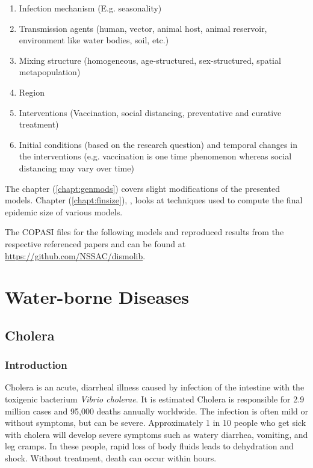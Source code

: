 \documentclass{book}\usepackage[]{graphicx}\usepackage[]{color}
\begin{document}
\begin{enumerate}
    \item Infection mechanism (E.g. seasonality)
    \item Transmission agents (human, vector, animal host, animal reservoir, environment like water bodies, soil, etc.)
    \item Mixing structure (homogeneous, age-structured, sex-structured, spatial metapopulation)
    \item Region
    \item Interventions (Vaccination, social distancing, preventative and curative treatment)
    \item Initial conditions (based on the research question) and temporal changes in the interventions (e.g. vaccination is one time phenomenon whereas social distancing may vary over time)
\end{enumerate}

The  chapter (\ref{chapt:genmods}) covers slight modifications of the presented models. Chapter (\ref{chapt:finsize}), , looks at techniques used to compute the final epidemic size of various models. 


The COPASI files for the following models and reproduced results from the respective referenced papers and can be found at \url{https://github.com/NSSAC/dismolib}.


\chapter{Water-borne Diseases}
\label{chapt:waterborne}

\section{Cholera}
\subsection*{Introduction}
Cholera is an acute, diarrheal illness caused by infection of the intestine with the toxigenic bacterium {\it Vibrio cholerae}. It is estimated Cholera is responsible for 2.9 million cases and 95,000 deaths annually worldwide. The infection is often mild or without symptoms, but can be severe. Approximately 1 in 10 people who get sick with cholera will develop severe symptoms such as watery diarrhea, vomiting, and leg cramps. In these people, rapid loss of body fluids leads to dehydration and shock. Without treatment, death can occur within hours.
\end{document}
